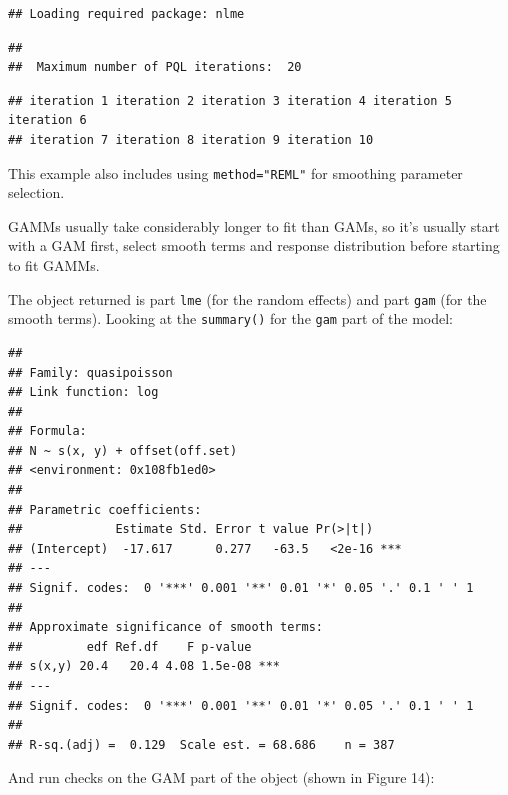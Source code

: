 \documentclass[]{amsart}
\newenvironment{Shaded}{}{}
\newcommand{\KeywordTok}[1]{\textcolor[rgb]{0.00,0.44,0.13}{\textbf{{#1}}}}
\newcommand{\NormalTok}[1]{{#1}}
\begin{document}
\begin{verbatim}
## Loading required package: nlme
\end{verbatim}

\begin{verbatim}
## 
##  Maximum number of PQL iterations:  20
\end{verbatim}

\begin{verbatim}
## iteration 1 iteration 2 iteration 3 iteration 4 iteration 5 iteration 6
## iteration 7 iteration 8 iteration 9 iteration 10
\end{verbatim}

This example also includes using \texttt{method="REML"} for smoothing
parameter selection.

GAMMs usually take considerably longer to fit than GAMs, so it's usually
start with a GAM first, select smooth terms and response distribution
before starting to fit GAMMs.

The object returned is part \texttt{lme} (for the random effects) and
part \texttt{gam} (for the smooth terms). Looking at the
\texttt{summary()} for the \texttt{gam} part of the model:

\begin{Shaded}
\end{Shaded}

\begin{verbatim}
## 
## Family: quasipoisson 
## Link function: log 
## 
## Formula:
## N ~ s(x, y) + offset(off.set)
## <environment: 0x108fb1ed0>
## 
## Parametric coefficients:
##             Estimate Std. Error t value Pr(>|t|)    
## (Intercept)  -17.617      0.277   -63.5   <2e-16 ***
## ---
## Signif. codes:  0 '***' 0.001 '**' 0.01 '*' 0.05 '.' 0.1 ' ' 1
## 
## Approximate significance of smooth terms:
##         edf Ref.df    F p-value    
## s(x,y) 20.4   20.4 4.08 1.5e-08 ***
## ---
## Signif. codes:  0 '***' 0.001 '**' 0.01 '*' 0.05 '.' 0.1 ' ' 1
## 
## R-sq.(adj) =  0.129  Scale est. = 68.686    n = 387
\end{verbatim}

And run checks on the GAM part of the object (shown in Figure 14):

\begin{Shaded}
\end{Shaded}
\end{document}
